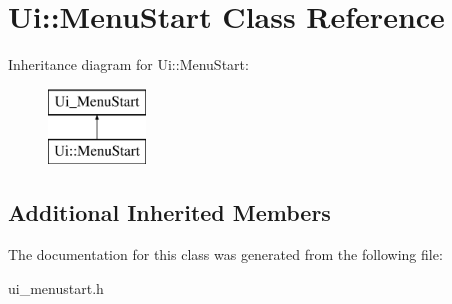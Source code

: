 \hypertarget{class_ui_1_1_menu_start}{}\section{Ui\+:\+:Menu\+Start Class Reference}
\label{class_ui_1_1_menu_start}
Inheritance diagram for Ui\+:\+:Menu\+Start\+:\begin{figure}[H]
\begin{center}
\leavevmode
\includegraphics[height=2.000000cm]{class_ui_1_1_menu_start}
\end{center}
\end{figure}
\subsection*{Additional Inherited Members}


The documentation for this class was generated from the following file\+:\begin{DoxyCompactItemize}
\item 
ui\+\_\+menustart.\+h\end{DoxyCompactItemize}
